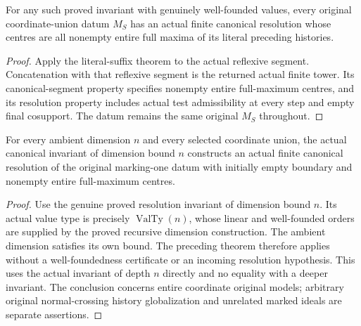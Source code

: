 \begin{theorem}
\label{hir:homogeneous-actual-entire-coordinate-canonical-resolution}
For any such proved invariant with genuinely well-founded values,
every original coordinate-union datum $M_S$ has an actual finite
canonical resolution whose centres are all nonempty entire full
maxima of its literal preceding histories.
\leanok
{}
\end{theorem}
\begin{proof}
Apply the literal-suffix theorem to the actual reflexive segment.
Concatenation with that reflexive segment is the returned actual
finite tower. Its canonical-segment property specifies nonempty
entire full-maximum centres, and its resolution property includes
actual test admissibility at every step and empty final cosupport.
The datum remains the same original $M_S$ throughout.
\end{proof}

\begin{corollary}
\label{hir:homogeneous-actual-canonicalInvariant-coordinate-resolution}
For every ambient dimension $n$ and every selected coordinate union,
the actual canonical invariant of dimension bound $n$ constructs an
actual finite canonical resolution of the original marking-one datum
with initially empty boundary and nonempty entire full-maximum centres.
\leanok
{}
\end{corollary}
\begin{proof}
Use the genuine proved resolution invariant of dimension bound $n$.
Its actual value type is precisely $\operatorname{ValTy}(n)$, whose
linear and well-founded orders are supplied by the proved recursive
dimension construction. The ambient dimension satisfies its own bound.
The preceding theorem therefore applies without a well-foundedness
certificate or an incoming resolution hypothesis. This uses the
actual invariant of depth $n$ directly and no equality with a deeper
invariant. The conclusion concerns entire coordinate original models;
arbitrary original normal-crossing history globalization and unrelated
marked ideals are separate assertions.
\end{proof}
